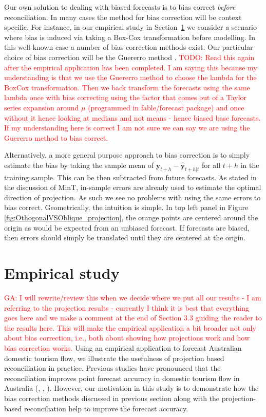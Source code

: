 \documentclass[12pt]{article}
\theoremstyle{definition}
\theoremstyle{property}
\begin{document}
	Our own solution to dealing with biased forecasts is to bias correct {\em before} reconciliation.  In many cases the method for bias correction will be context specific.  For instance, in  our empirical study in Section~\ref{sec:EmpStudy} we consider a scenario where bias is induced via taking a Box-Cox transformation before modelling.  In this well-known case a number of bias correction methods exist.  Our particular choice of bias correction will be the Guererro method \citep{guerrero1993time}. \textcolor{red}{TODO: Read this again after the empirical application has been completed. I am saying this because my understanding is that we use the Guererro method to choose the lambda for the BoxCox transformation. Then we back transform the forecasts using the same lambda once with bias correcting using the factor that comes out of a Taylor series expansion around $\mu$ (programmed in fable/forecast package) and once without it hence looking at medians and not means - hence biased base forecasts. If my understanding here is correct I am not sure we can say we are using the Guererro method to bias correct.}


	
	Alternatively, a more general purpose approach to bias correction is to simply estimate the bias by taking the sample mean of $\bm{y
	}_{t+h}-\hat{\bm{y}}_{t+h|t}$ for all $t+h$ in the training sample.  This can be then subtracted from future forecasts.  As stated in the discussion of MinT, in-sample errors are already used to estimate the optimal direction of projection.  As such we see no problems with using the same errors to bias correct.  Geometrically, the intuition is simple.  In top left panel in Figure \ref{fig:OthogonalVSOblique_projection}, the orange points are centered around the origin as would be expected from an unbiased forecast.  If forecasts are biased, then errors should simply be translated until they are centered at the origin.
	
	\section{Empirical study} \label{sec:EmpStudy}
	
	
	\textcolor{red}{GA: I will rewrite/review this when we decide where we put all our results - I am referring to the projection results - currently I think it is best that everything goes here and we make a comment at the end of Section 3.3 guiding the reader to the results here. This will make the empirical application a bit broader not only about bias correction, i.e., both about showing how projections work and how bias correction works.} Using an empirical application to forecast Australian domestic tourism flow, we illustrate the usefulness of projection based reconciliation in practice. Previous studies have pronounced that the reconciliation improves point forecast accuracy in domestic tourism flow in Australia (\cite{Athanasopoulos2009}, \cite{Hyndman2011}, \cite{WicEtAl2019}). However, our motivation in this study is to demonstrate how the bias correction methods discussed in previous section along with the projection-based reconciliation help to improve the forecast accuracy.
	
\end{document}
